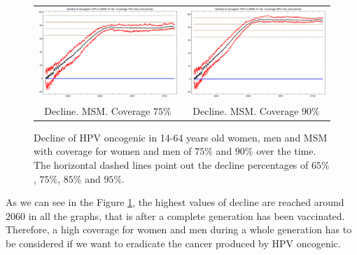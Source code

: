 \begin{figure}[!]
\begin{tabular}{cc}
		\includegraphics[width=0.5\linewidth]{IMGs/7.-Erradicacion_ONCO/Decl_MSM_14_64_onco_75_75.pdf}	& 
		\includegraphics[width=0.5\linewidth]{IMGs/7.-Erradicacion_ONCO/Decl_MSM_14_64_onco_90_90.pdf}  \\ 
		Decline. MSM. Coverage $75\%$	& Decline. MSM. Coverage $90\%$
	\end{tabular} 
	\caption{Decline of HPV oncogenic in 14-64 years old women, men and MSM with coverage for women and men of $75\%$ and $90\%$ over the time. The horizontal dashed lines point out the decline percentages of $65\%$, $75\%$, $85\%$ and $95\%$.}
	\label{fig:erradicacion}
\end{figure}

As we can see in the Figure \ref{fig:erradicacion}, the highest values of decline are reached around $2060$ in all the graphs, that is after a complete generation has been vaccinated. Therefore, a high coverage for women and men during a whole generation has to be considered if we want to eradicate the cancer produced by HPV oncogenic. 
